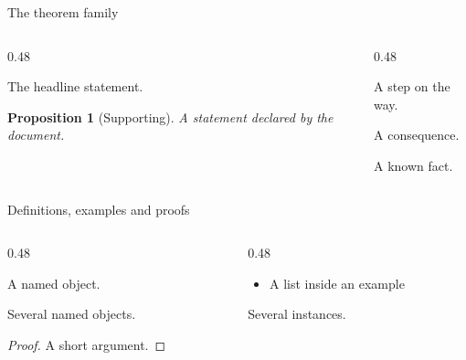 \documentclass[aspectratio=169]{beamer}
\newtheorem{proposition}[theorem]{Proposition}
\begin{document}
\begin{frame}{The theorem family}
  \begin{columns}[T]
    \begin{column}{0.48\textwidth}
      \begin{theorem}
        The headline statement.
      \end{theorem}
      \begin{proposition}[Supporting]
        A statement declared by the document.
      \end{proposition}
    \end{column}
    \begin{column}{0.48\textwidth}
      \begin{lemma}[Technical]
        A step on the way.
      \end{lemma}
      \begin{corollary}
        A consequence.
      \end{corollary}
      \begin{fact}
        A known fact.
      \end{fact}
    \end{column}
  \end{columns}
\end{frame}

\begin{frame}{Definitions, examples and proofs}
  \begin{columns}[T]
    \begin{column}{0.48\textwidth}
      \begin{definition}
        A named object.
      \end{definition}
      \begin{definitions}
        Several named objects.
      \end{definitions}
      \begin{proof}
        A short argument.
      \end{proof}
    \end{column}
    \begin{column}{0.48\textwidth}
      \begin{example}[Torus]
        \begin{itemize}
          \item A list inside an example
        \end{itemize}
      \end{example}
      \begin{examples}
        Several instances.
      \end{examples}
    \end{column}
  \end{columns}
\end{frame}
\end{document}
